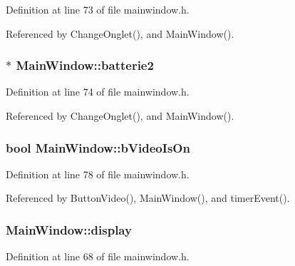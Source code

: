 Definition at line 73 of file mainwindow.\-h.



Referenced by Change\-Onglet(), and Main\-Window().

\hypertarget{classMainWindow_a2c5aa6244af6d3e2018b98f285b0b84a}{
\subsubsection[{batterie2}]{$\ast$ Main\-Window\-::batterie2\hspace{0.3cm}{\ttfamily [private]}}}\label{classMainWindow_a2c5aa6244af6d3e2018b98f285b0b84a}


Definition at line 74 of file mainwindow.\-h.



Referenced by Change\-Onglet(), and Main\-Window().

\hypertarget{classMainWindow_a8f36c27c20d39c3f0eafe091b9f2cf29}{
\subsubsection[{b\-Video\-Is\-On}]{\setlength{\rightskip}{0pt plus 5cm}bool Main\-Window\-::b\-Video\-Is\-On\hspace{0.3cm}{\ttfamily [private]}}}\label{classMainWindow_a8f36c27c20d39c3f0eafe091b9f2cf29}


Definition at line 78 of file mainwindow.\-h.



Referenced by Button\-Video(), Main\-Window(), and timer\-Event().

\hypertarget{classMainWindow_a144a0c272b675a9e8721ee486d629874}{
\subsubsection[{display}]{ Main\-Window\-::display\hspace{0.3cm}{\ttfamily [private]}}}\label{classMainWindow_a144a0c272b675a9e8721ee486d629874}


Definition at line 68 of file mainwindow.\-h.

